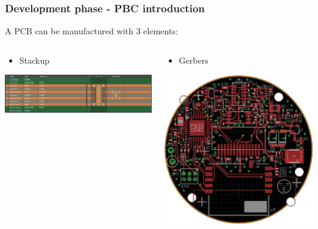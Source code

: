 \documentclass[11pt,xcolor=table,aspectratio=169]{beamer}
\begin{document}
	\begin{frame}
		\frametitle{Development phase - PBC introduction}
		A PCB can be manufactured with 3 elements:
		\begin{columns}[t]
			\begin{column}{0.33\paperwidth}
				\begin{itemize}
					\item Stackup
				\end{itemize}
				\centering
				\vspace{.2cm}
				\includegraphics[width=.75\textwidth]{media/Stackup.png}
			\end{column}
			\begin{column}{0.33\paperwidth}
				\begin{itemize}
					\item Gerbers
				\end{itemize}
				\centering
				\vspace{.2cm}
				\begin{adjustbox}{max height=.35\textheight}
					\includegraphics{media/gerbers.png}
				\end{adjustbox}
				

\end{column}
\end{columns}
\end{frame}
\end{document}
